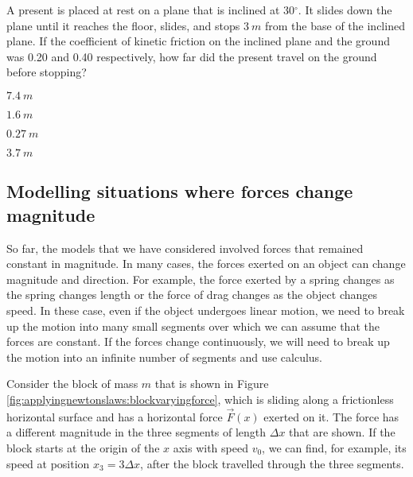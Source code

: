 \begin{checkpoint}
\begin{MCquestion}{A present is placed at rest on a plane that is inclined at 30$^{\circ}$. It slides down the plane until it reaches the floor, slides, and stops $\SI{3}{m}$ from the base of the inclined plane. If the coefficient of kinetic friction on the inclined plane and the ground was 0.20 and 0.40 respectively, how far did the present travel on the ground before stopping?}
\item $\SI{7.4}{m}$
\item $\SI{1.6}{m}$
\item $\SI{0.27}{m}$
\item $\SI{3.7}{m}$
\end{MCquestion}
\end{checkpoint}


\subsection{Modelling situations where forces change magnitude}
So far, the models that we have considered involved forces that remained constant in magnitude. In many cases, the forces exerted on an object can change magnitude and direction. For example, the force exerted by a spring changes as the spring changes length or the force of drag changes as the object changes speed. In these case, even if the object undergoes linear motion, we need to break up the motion into many small segments over which we can assume that the forces are constant. If the forces change continuously, we will need to break up the motion into an infinite number of segments and use calculus.

Consider the block of mass $m$ that is shown in Figure \ref{fig:applyingnewtonslaws:blockvaryingforce}, which is sliding along a frictionless horizontal surface and has a  horizontal force $\vec F(x)$ exerted on it. The force has a different magnitude in the three segments of length $\Delta x$ that are shown. If the block starts at the origin of the $x$ axis with speed $v_0$, we can find, for example, its speed at position $x_3=3\Delta x$, after the block travelled through the three segments.


